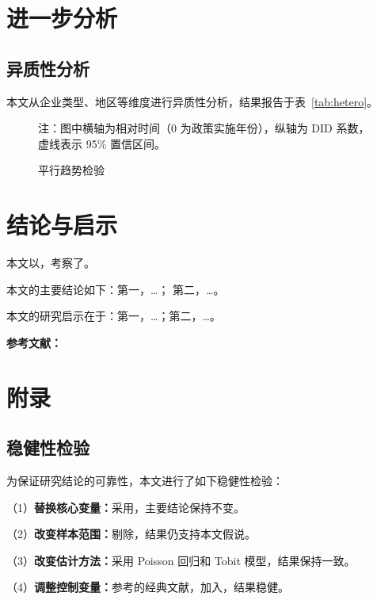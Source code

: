 \documentclass[lang=cn, alanguage={chinese}, aaffiliation={中国}, aoptions={authoryear}]{ctexart}
\begin{document}
\section{进一步分析}
\label{sec:additional}

\subsection{异质性分析}
\label{sec:hetero}

本文从企业类型、地区等维度进行异质性分析，结果报告于表~\ref{tab:hetero}。

\begin{figure}[htbp]
    \centering
    \caption{平行趋势检验}
    \label{fig:parallel}
    \begin{minipage}{0.8\textwidth}\footnotesize
        注：图中横轴为相对时间（0 为政策实施年份），纵轴为 DID 系数，
        虚线表示 95\% 置信区间。
    \end{minipage}
\end{figure}

\section{结论与启示}
\label{sec:conclusion}

本文以，考察了。

本文的主要结论如下：第一，\dots； 第二，\dots。

本文的研究启示在于：第一，\dots；第二，\dots。

\textbf{参考文献：}


\newpage
\appendix
\section{附录}

\subsection{稳健性检验}
\label{app:robust}

为保证研究结论的可靠性，本文进行了如下稳健性检验：

（1）\textbf{替换核心变量：}采用，主要结论保持不变。

（2）\textbf{改变样本范围：}剔除，结果仍支持本文假说。

（3）\textbf{改变估计方法：}采用 Poisson 回归和 Tobit 模型，结果保持一致。

（4）\textbf{调整控制变量：}参考\citet{xxx}的经典文献，加入，结果稳健。
\end{document}
